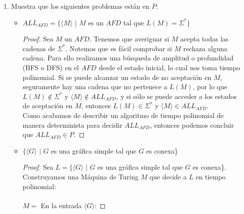 \documentclass[letterpaper,10pt]{article}
\begin{document}
\begin{enumerate}
\begin{itemize}
\begin{proof}
         \end{proof}

     \end{itemize}
     
     \item Muestra que los siguientes problemas están en $P$:
     
     \begin{itemize}
         
         \item $ALL_{AFD} = \{\langle M \rangle$ $|$ $M$ es un $AFD$ tal que
         $L(M) = \Sigma^{*}\}$
         
         \begin{proof}
             Sea $M$ un $AFD$. Tenemos que averiguar si $M$ acepta todas las
             cadenas de $\Sigma^{*}$. Notemos que es fácil comprobar si $M$
             rechaza alguna cadena. Para ello realizamos una búsqueda de 
             amplitud o profundidad (BFS o DFS) en el $AFD$ desde el estado inicial, lo
             cual nos toma tiempo polinomial. Si se puede alcanzar un estado de
             no aceptación en $M$, seguramente hay una cadena que no
             pertenece a $L(M)$, por lo que $L(M) \notin \Sigma^{*}$ y 
             $\langle M \rangle \notin ALL_{AFD}$, y si sólo se puede acceder a 
             los estados de aceptación en $M$, entonces $L(M) \in \Sigma^{*}$
             y $\langle M \rangle \in ALL_{AFD}$. \\ 
             Como acabamos de describir un algoritmo de tiempo polinomial
             de manera determinista para  decidir $ALL_{AFD}$, entonces 
             podemos concluir que $ALL_{AFD} \in P$.
             
         \end{proof}

         \item $\{\langle G \rangle$ $|$ $G$ es una gráfica simple tal que $G$
         es conexa\}
         
         \begin{proof}
             Sea $L = \{\langle G \rangle$ $|$ $G$ es una gráfica simple tal
             que $G$ es conexa\}. Construyamos una Máquina de Turing $M$
             que decide a $L$ en tiempo polinomial: \\ \\
             $M = $
             En la entrada $\langle G \rangle$:
             

\end{proof}
\end{itemize}
\end{enumerate}
\end{document}

